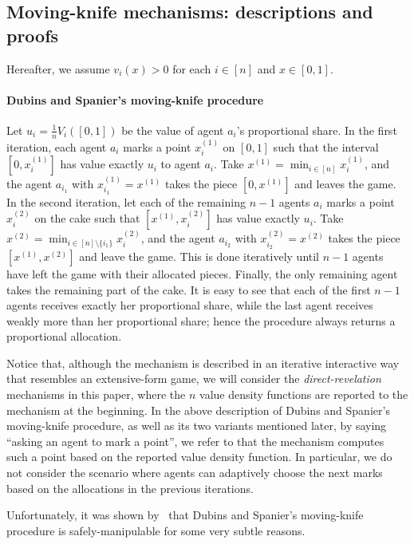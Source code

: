 \begin{toappendix}
\subsection{Moving-knife mechanisms: descriptions and proofs}
Hereafter, we assume $v_i(x)>0$ for each $i\in[n]$ and $x\in[0,1]$.

\paragraph{Dubins and Spanier's moving-knife procedure}
Let $u_i=\frac1nV_i([0,1])$ be the value of agent $a_i$'s proportional share.
In the first iteration, each agent $a_i$ marks a point $x_i^{(1)}$ on $[0,1]$ such that the interval $[0,x_i^{(1)}]$ has value exactly $u_i$ to agent $a_i$.
Take $x^{(1)}=\min_{i\in[n]}x_i^{(1)}$, and the agent $a_{i_1}$ with $x_{i_1}^{(1)}=x^{(1)}$ takes the piece $[0,x^{(1)}]$ and leaves the game.
In the second iteration, let each of the remaining $n-1$ agents $a_i$ marks a point $x_i^{(2)}$ on the cake such that $[x^{(1)},x_i^{(2)}]$ has value exactly $u_i$.
Take $x^{(2)}=\min_{i\in[n]\setminus\{i_1\}}x_i^{(2)}$, and the agent $a_{i_2}$ with $x_{i_2}^{(2)}=x^{(2)}$ takes the piece $[x^{(1)},x^{(2)}]$ and leave the game.
This is done iteratively until $n-1$ agents have left the game with their allocated pieces.
Finally, the only remaining agent takes the remaining part of the cake.
It is easy to see that each of the first $n-1$ agents receives exactly her proportional share, while the last agent receives weakly more than her proportional share; hence the procedure always returns a proportional allocation.

Notice that, although the mechanism is described in an iterative interactive way that resembles an extensive-form game, we will consider the \emph{direct-revelation} mechanisms in this paper, where the $n$ value density functions are reported to the mechanism at the beginning.
In the above description of Dubins and Spanier's moving-knife procedure, as well as its two variants mentioned later, by saying ``asking an agent to mark a point'', we refer to that the mechanism computes such a point based on the reported value density function.
In particular, we do not consider the scenario where agents can adaptively choose the next marks based on the allocations in the previous iterations.

Unfortunately, it was shown by~\citet{BU2023Rat} that Dubins and Spanier's moving-knife procedure is safely-manipulable for some very subtle reasons.



\end{toappendix}
